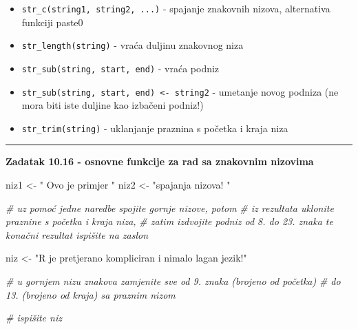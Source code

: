 \documentclass[]{book}
\newenvironment{Shaded}{\begin{snugshade}}{\end{snugshade}}
\newcommand{\KeywordTok}[1]{\textcolor[rgb]{0.13,0.29,0.53}{\textbf{#1}}}
\newcommand{\DecValTok}[1]{\textcolor[rgb]{0.00,0.00,0.81}{#1}}
\newcommand{\StringTok}[1]{\textcolor[rgb]{0.31,0.60,0.02}{#1}}
\newcommand{\CommentTok}[1]{\textcolor[rgb]{0.56,0.35,0.01}{\textit{#1}}}
\newcommand{\OperatorTok}[1]{\textcolor[rgb]{0.81,0.36,0.00}{\textbf{#1}}}
\newcommand{\NormalTok}[1]{#1}
\providecommand{\tightlist}{%
  \setlength{\itemsep}{0pt}\setlength{\parskip}{0pt}}
\theoremstyle{definition}
\theoremstyle{definition}
\theoremstyle{definition}
\theoremstyle{remark}
\begin{document}
\begin{itemize}
\tightlist
\item
  \texttt{str\_c(string1,\ string2,\ ...)} - spajanje znakovnih nizova,
  alternativa funkciji paste0
\item
  \texttt{str\_length(string)} - vraća duljinu znakovnog niza
\item
  \texttt{str\_sub(string,\ start,\ end)} - vraća podniz
\item
  \texttt{str\_sub(string,\ start,\ end)\ \textless{}-\ string2} -
  umetanje novog podniza (ne mora biti iste duljine kao izbačeni
  podniz!)
\item
  \texttt{str\_trim(string)} - uklanjanje praznina s početka i kraja
  niza
\end{itemize}

\begin{center}\rule{0.5\linewidth}{\linethickness}\end{center}

\textbf{Zadatak 10.16 - osnovne funkcije za rad sa znakovnim nizovima}

\begin{Shaded}
\begin{Highlighting}[]
\NormalTok{niz1 <-}\StringTok{ "        Ovo je primjer "}
\NormalTok{niz2 <-}\StringTok{ "spajanja nizova!       "}

\CommentTok{# uz pomoć jedne naredbe spojite gornje nizove, potom}
\CommentTok{# iz rezultata uklonite praznine s početka i kraja niza,}
\CommentTok{# zatim izdvojite podniz od 8. do 23. znaka te konačni rezultat ispišite na zaslon}

\NormalTok{niz <-}\StringTok{ "R je pretjerano kompliciran i nimalo lagan jezik!"}

\CommentTok{# u gornjem nizu znakova zamjenite sve od 9. znaka (brojeno od početka)}
\CommentTok{# do 13. (brojeno od kraja) sa praznim nizom }

\CommentTok{# ispišite niz}
\end{Highlighting}
\end{Shaded}

\begin{Shaded}
\end{Shaded}
\end{document}
